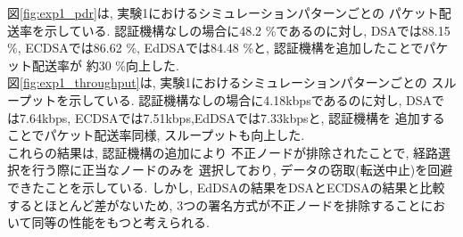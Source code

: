 \indent 図\ref{fig:exp1_pdr}は, 実験1におけるシミュレーションパターンごとの
パケット配送率を示している. 認証機構なしの場合に48.2 \%であるのに対し, DSAでは88.15 \%, 
ECDSAでは86.62 \%, EdDSAでは84.48 \%と, 認証機構を追加したことでパケット配送率が
約30 \%向上した. \\
\indent 図\ref{fig:exp1_throughput}は, 実験1におけるシミュレーションパターンごとの
スループットを示している. 認証機構なしの場合に4.18kbpsであるのに対し, 
DSAでは7.64kbps, ECDSAでは7.51kbps,EdDSAでは7.33kbpsと, 認証機構を
追加することでパケット配送率同様, スループットも向上した. \\
\indent これらの結果は, 認証機構の追加により 
不正ノードが排除されたことで, 経路選択を行う際に正当なノードのみを
選択しており,  データの窃取(転送中止)を回避できたことを示している. 
しかし, EdDSAの結果をDSAとECDSAの結果と比較するとほとんど差がないため, 
3つの署名方式が不正ノードを排除することにおいて同等の性能をもつと考えられる. 



